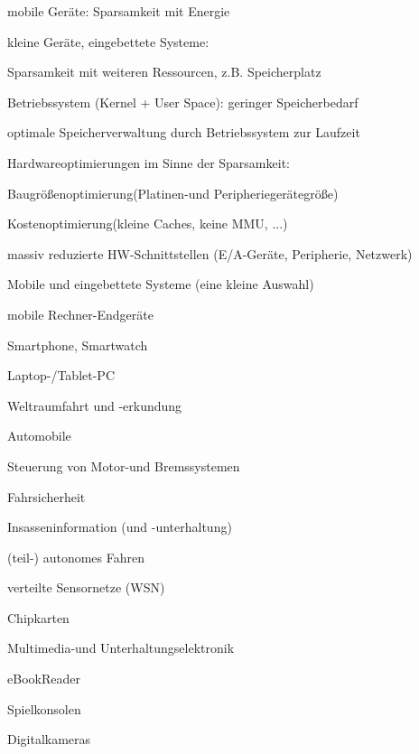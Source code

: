 \documentclass[a4paper]{article}
\begin{document}
\begin{multicols}{3}
    \begin{itemize*}
        \item
        mobile Geräte: Sparsamkeit mit Energie
        \item
        kleine Geräte, eingebettete Systeme:
        \begin{itemize*}
            \item Sparsamkeit mit weiteren Ressourcen, z.B. Speicherplatz
            \item Betriebssystem (Kernel + User Space): geringer Speicherbedarf
            \item optimale Speicherverwaltung durch Betriebssystem zur Laufzeit
        \end{itemize*}
        \item
        Hardwareoptimierungen im Sinne der Sparsamkeit:
        \begin{itemize*}
            \item Baugrößenoptimierung(Platinen-und Peripheriegerätegröße)
            \item Kostenoptimierung(kleine Caches, keine MMU, ...)
            \item massiv reduzierte HW-Schnittstellen (E/A-Geräte, Peripherie, Netzwerk)
        \end{itemize*}
    \end{itemize*}

    Mobile und eingebettete Systeme (eine kleine Auswahl)

    \begin{itemize*}
        \item
        mobile Rechner-Endgeräte
        \begin{itemize*}
            \item Smartphone, Smartwatch
            \item Laptop-/Tablet-PC
        \end{itemize*}
        \item
        Weltraumfahrt und -erkundung
        \item
        Automobile
        \begin{itemize*}
            \item Steuerung von Motor-und Bremssystemen
            \item Fahrsicherheit
            \item Insasseninformation (und -unterhaltung)
            \item (teil-) autonomes Fahren
        \end{itemize*}
        \item
        verteilte Sensornetze (WSN)
        \item
        Chipkarten
        \item
        Multimedia-und Unterhaltungselektronik
        \begin{itemize*}
            \item eBookReader
            \item Spielkonsolen
            \item Digitalkameras
        \end{itemize*}
    \end{itemize*}


\end{multicols}
\end{document}
